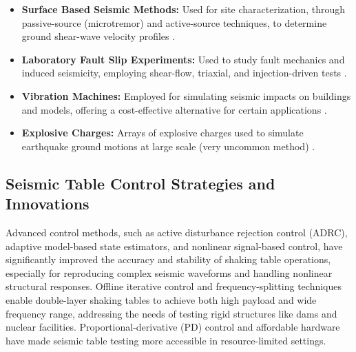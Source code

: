 \documentclass[9pt]{extarticle}
\begin{document}
\begin{itemize}
    \item \textbf{Surface Based Seismic Methods:} Used for site characterization, through passive-source (microtremor) and active-source techniques, to determine ground shear-wave velocity profiles \citep{Luke2008Characterizing}.
    
    \item \textbf{Laboratory Fault Slip Experiments:} Used to study fault mechanics and induced seismicity, employing shear-flow, triaxial, and injection-driven tests \citep{Ji2022Laboratory,Dong2022Investigations}.
    
    \item \textbf{Vibration Machines:} Employed for simulating seismic impacts on buildings and models, offering a cost-effective alternative for certain applications \citep{Abovyan2024Method}.

    \item \textbf{Explosive Charges:} Arrays of explosive charges used to simulate earthquake ground motions at large scale (very uncommon method) \citep{williams2001}.
\end{itemize}



\subsection{Seismic Table Control Strategies and Innovations}
Advanced control methods, such as active disturbance rejection control (ADRC), adaptive model-based state estimators, and nonlinear signal-based control, have significantly improved the accuracy and stability of shaking table operations, especially for reproducing complex seismic waveforms and handling nonlinear structural responses. %
Offline iterative control and frequency-splitting techniques enable double-layer shaking tables to achieve both high payload and wide frequency range, addressing the needs of testing rigid structures like dams and nuclear facilities. %
Proportional-derivative (PD) control and affordable hardware have made seismic table testing more accessible in resource-limited settings. %
\end{document}

